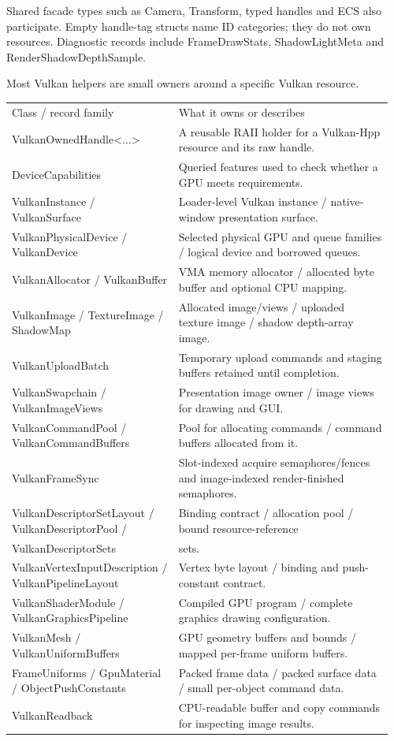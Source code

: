 \documentclass[11pt,a4paper]{article}
\begin{document}
Shared facade types such as Camera, Transform, typed handles and ECS also participate. Empty handle-tag structs name ID categories; they do not own resources. Diagnostic records include FrameDrawStats, ShadowLightMeta and RenderShadowDepthSample.

\label{core-49}
Most Vulkan helpers are small owners around a specific Vulkan resource.

{\small
\begin{longtable}{@{}p{0.42\linewidth}p{0.54\linewidth}@{}}
Class / record family & What it owns or describes \\
VulkanOwnedHandle<...> & A reusable RAII holder for a Vulkan-Hpp resource and its raw handle. \\
DeviceCapabilities & Queried features used to check whether a GPU meets requirements. \\
VulkanInstance / VulkanSurface & Loader-level Vulkan instance / native-window presentation surface. \\
VulkanPhysicalDevice / VulkanDevice & Selected physical GPU and queue families / logical device and borrowed queues. \\
VulkanAllocator / VulkanBuffer & VMA memory allocator / allocated byte buffer and optional CPU mapping. \\
VulkanImage / TextureImage / ShadowMap & Allocated image/views / uploaded texture image / shadow depth-array image. \\
VulkanUploadBatch & Temporary upload commands and staging buffers retained until completion. \\
VulkanSwapchain / VulkanImageViews & Presentation image owner / image views for drawing and GUI. \\
VulkanCommandPool / VulkanCommandBuffers & Pool for allocating commands / command buffers allocated from it. \\
VulkanFrameSync & Slot-indexed acquire semaphores/fences and image-indexed render-finished semaphores. \\
VulkanDescriptorSetLayout / VulkanDescriptorPool / & Binding contract / allocation pool / bound resource-reference \\
VulkanDescriptorSets & sets. \\
VulkanVertexInputDescription / VulkanPipelineLayout & Vertex byte layout / binding and push-constant contract. \\
VulkanShaderModule / VulkanGraphicsPipeline & Compiled GPU program / complete graphics drawing configuration. \\
VulkanMesh / VulkanUniformBuffers & GPU geometry buffers and bounds / mapped per-frame uniform buffers. \\
FrameUniforms / GpuMaterial / ObjectPushConstants & Packed frame data / packed surface data / small per-object command data. \\
VulkanReadback & CPU-readable buffer and copy commands for inspecting image results. \\
\end{longtable}
}
\end{document}
